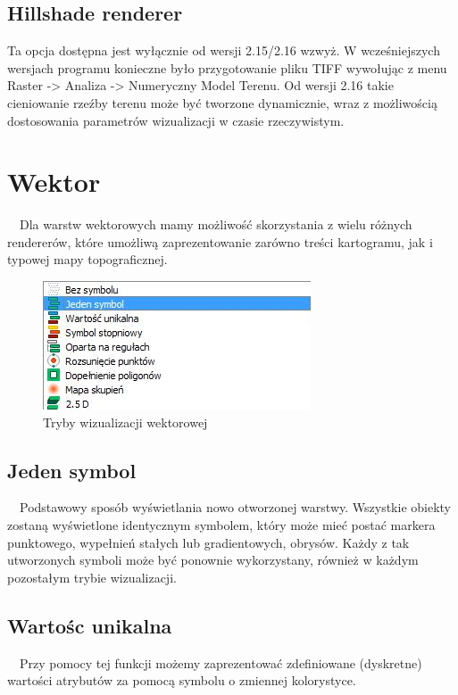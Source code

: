 \documentclass[12pt,a4paper]{book}
\begin{document}
\subsection{Hillshade renderer}
Ta opcja dostępna jest wyłącznie od wersji 2.15/2.16 wzwyż. W wcześniejszych wersjach programu konieczne było przygotowanie pliku TIFF wywołując z menu Raster -{\textgreater} Analiza -{\textgreater} Numeryczny Model Terenu. Od wersji 2.16 takie cieniowanie rzeźby terenu może być tworzone dynamicznie, wraz z możliwością dostosowania parametrów wizualizacji w czasie rzeczywistym.

\section{Wektor}
\ \ Dla warstw wektorowych mamy możliwość skorzystania z wielu różnych rendererów, które umożliwą zaprezentowanie zarówno treści kartogramu, jak i typowej mapy topograficznej.



\begin{center}
\begin{figure}
\includegraphics[width=7.938cm,height=3.81cm]{007-wektor-tryby.jpg}
\caption{Tryby wizualizacji wektorowej}
\end{figure}
\end{center}

\subsection{Jeden symbol}
\ \ Podstawowy sposób wyświetlania nowo otworzonej warstwy. Wszystkie obiekty zostaną wyświetlone identycznym symbolem, który może mieć postać markera punktowego, wypełnień stałych lub gradientowych, obrysów. Każdy z tak utworzonych symboli może być ponownie wykorzystany, również w każdym pozostałym trybie wizualizacji. 

\subsection{Wartośc unikalna}
\ \ Przy pomocy tej funkcji możemy zaprezentować zdefiniowane (dyskretne) wartości atrybutów za pomocą symbolu o zmiennej kolorystyce.
\end{document}

